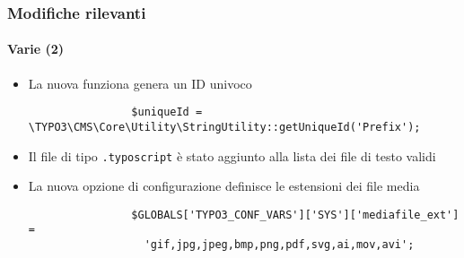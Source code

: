 \begin{frame}[fragile]
	\frametitle{Modifiche rilevanti}
	\framesubtitle{Varie (2)}


	\begin{itemize}

		\item La nuova funziona genera un ID univoco

			\begin{lstlisting}
				$uniqueId = \TYPO3\CMS\Core\Utility\StringUtility::getUniqueId('Prefix');
			\end{lstlisting}

		\item Il file di tipo \texttt{.typoscript} è stato aggiunto alla lista dei file di testo validi

		\item La nuova opzione di configurazione definisce le estensioni dei file media

			\begin{lstlisting}
				$GLOBALS['TYPO3_CONF_VARS']['SYS']['mediafile_ext'] =
				  'gif,jpg,jpeg,bmp,png,pdf,svg,ai,mov,avi';
			\end{lstlisting}

	\end{itemize}

	\breakingchange

\end{frame}

